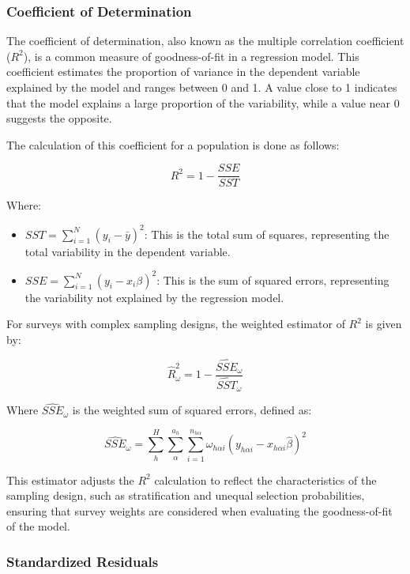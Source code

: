 \documentclass[
  12pt,
]{book}
\providecommand{\tightlist}{%
  \setlength{\itemsep}{0pt}\setlength{\parskip}{0pt}}
\begin{document}
\hypertarget{coefficient-of-determination}{%
\subsubsection{Coefficient of Determination}\label{coefficient-of-determination}}

The coefficient of determination, also known as the multiple correlation coefficient (\(R^{2}\)), is a common measure of goodness-of-fit in a regression model. This coefficient estimates the proportion of variance in the dependent variable explained by the model and ranges between 0 and 1. A value close to 1 indicates that the model explains a large proportion of the variability, while a value near 0 suggests the opposite.

The calculation of this coefficient for a population is done as follows:

\[
R^{2} =  1-\frac{SSE}{SST}
\]

Where:

\begin{itemize}
\tightlist
\item
  \(SST= \sum_{i=1}^N (y_i - \bar{y})^2\): This is the total sum of squares, representing the total variability in the dependent variable.
\item
  \(SSE= \sum_{i=1}^N (y_i - x_i \beta)^2\): This is the sum of squared errors, representing the variability not explained by the regression model.
\end{itemize}

For surveys with complex sampling designs, the weighted estimator of \(R^{2}\) is given by:

\[
\widehat{R}_{\omega}^{2} = 1-\frac{\widehat{SSE}_{\omega}}{\widehat{SST}_{\omega}}
\]

Where \(\widehat{SSE}_{\omega}\) is the weighted sum of squared errors, defined as:

\[
\widehat{SSE}_{\omega}  =  \sum_{h}^{H}\sum_{\alpha}^{a_{h}}\sum_{i=1}^{n_{h\alpha}}\omega_{h\alpha i}\left(y_{h\alpha i}-x_{h\alpha i}\hat{\beta}\right)^{2}
\]

This estimator adjusts the \(R^{2}\) calculation to reflect the characteristics of the sampling design, such as stratification and unequal selection probabilities, ensuring that survey weights are considered when evaluating the goodness-of-fit of the model.

\hypertarget{standardized-residuals}{%
\subsubsection{Standardized Residuals}\label{standardized-residuals}}
\end{document}

